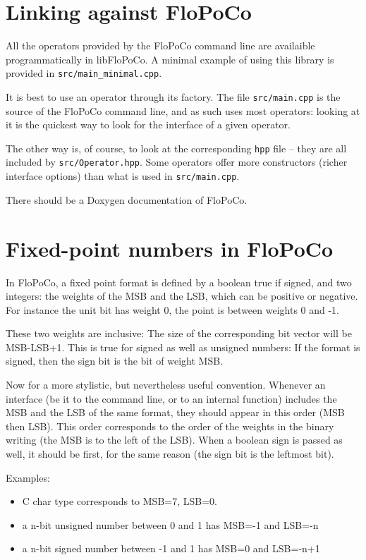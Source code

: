 \documentclass{article}
\begin{document}
\section{Linking against FloPoCo\label{sec:linking}}
All the operators provided by the FloPoCo command line are availaible
programmatically in libFloPoCo. A minimal example of using this
library is provided in \texttt{src/main\_minimal.cpp}.

It is best to use an operator through its factory. The file \texttt{src/main.cpp} is the source of the FloPoCo command
line, and as such uses most operators: looking at it is the quickest
way to look for the interface of a given operator.

The other way is, of course, to look at the corresponding \texttt{hpp}
file -- they are all included by \texttt{src/Operator.hpp}. Some
operators offer more constructors (richer interface options) than what
is used in \texttt{src/main.cpp}.

There should be a Doxygen documentation of FloPoCo.


\section{Fixed-point numbers in FloPoCo}
In FloPoCo, a fixed point format is defined by a boolean true if signed, and two integers: the weights of the MSB and the LSB, which can be positive or negative. 
For instance the unit bit has weight 0, the point is between weights 0 and -1. 

These two weights are inclusive: The size of the corresponding bit vector will be MSB-LSB+1.
This is true for signed as well as unsigned numbers: If the format is signed, then the sign bit is the bit of weight MSB.


Now for a more stylistic, but nevertheless useful convention. Whenever an interface (be it to the command line, or to an internal function) includes the MSB and the LSB of the same format, they should appear in this order (MSB then LSB). This order corresponds to the order of the weights in the binary writing (the MSB is to the left of the LSB). 
When a boolean sign is passed as well, it should be first, for the same reason (the sign bit is the leftmost bit).

Examples:
\begin{itemize}
\item C char type corresponds to MSB=7, LSB=0.
\item a n-bit unsigned number between 0 and 1 has MSB=-1 and LSB=-n
\item a n-bit signed number between -1 and 1 has MSB=0 and LSB=-n+1
\end{itemize}
\end{document}
